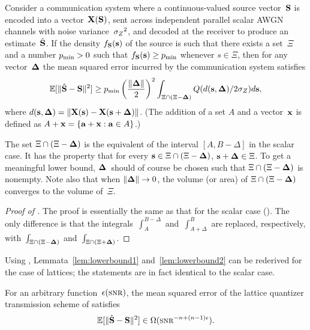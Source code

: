 \begin{lemma}
  \label{lem:zivboundvec}
  Consider a communication system where a continuous-valued source vector~$\S$
  is encoded into a vector~$\X(\S)$, sent across independent parallel scalar
  AWGN channels with noise variance~$\szq$, and decoded at the receiver to
  produce an estimate~$\Shv$. If the density $f_{\S}(\s)$ of the source is such
  that there exists a set~$\Xi$ and a number $\pmin > 0$ such that $f_{\S}(\s)
  \ge \pmin$ whenever $s \in \Xi$, then for any vector~$\Dv$ the mean squared
  error incurred by the communication system satisfies
  \begin{equation*}
    \msev \ge \pmin  \left( \frac{\|\Dv\|}{2}\right)^2 \int_{\Xi \cap (\Xi -
    \Dv)} Q(d(\s, \Dv)/2 \sz) d\s,
  \end{equation*}
  where $d(\s,\Dv) = \|\X(\s) - \X(\s + \Dv)\|$. (The addition of a set $A$ and
  a vector~$\x$ is defined as $A + \x = \{\vect{a} + \x : \vect{a} \in A\}$.)
\end{lemma}

\begin{remark}
  \label{rem:zivboundvec}
  The set $\Xi \cap (\Xi - \Dv)$ is the equivalent of the interval $[A,
  B-\Delta]$ in the scalar case. It has the property that for every $\s \in \Xi
  \cap (\Xi - \Dv)$, $\s + \Dv \in \Xi$. To get a meaningful lower bound,
  $\Dv$~should of course be chosen such that $\Xi \cap (\Xi - \Dv)$ is nonempty.
  Note also that when $\|\Dv\| \goesto 0$, the volume (or area) of $\Xi \cap
  (\Xi - \Dv)$ converges to the volume of~$\Xi$.
\end{remark}

\begin{proof}[Proof of ]
  The proof is essentially the same as that for the scalar case
  (). The only difference is that the
  integrals~$\int_A^{B-\Delta}$ and~$\int_{A+\Delta}^B$ are replaced,
  respectively, with~$\int_{\Xi \cap (\Xi - \Dv)}$ and~$\int_{\Xi \cap (\Xi +
  \Dv)}$.
\end{proof}

Using , Lemmata~\ref{lem:lowerbound1}
and~\ref{lem:lowerbound2} can be rederived for the case of lattices; the
statements are in fact identical to the scalar case.

\begin{lemma}
  \label{lem:lowerbound1vec}
  For an arbitrary function~$\e(\snr)$, the mean squared error of the lattice
  quantizer transmission scheme of  satisfies
  \begin{equation*}
    \msev \in \Omega(\snr^{-n + (n-1)\e}).
  \end{equation*}
\end{lemma}

